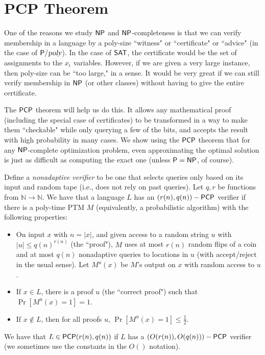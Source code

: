 \section{PCP Theorem}

One of the reasons we study ${\mathsf{NP}}$ and ${\mathsf{NP}}$-completeness is that we can verify membership in a language by a poly-size ``witness" or ``certificate" or ``advice" (in the case of ${\mathsf{P}}/{\textsl{poly}}$). In the case of ${\mathsf{SAT}}$, the certificate would be the set of assignments to the $x_i$ variables. However, if we are given a very large instance, then poly-size can be ``too large," in a sense. It would be very great if we can still verify membership in ${\mathsf{NP}}$ (or other classes) without having to give the entire certificate.

\par The ${\mathsf{PCP}}$ theorem will help us do this. It allows any mathematical proof (including the special case of certificates) to be transformed in a way to make them ``checkable" while only querying a few of the bits, and accepts the result with high probability in many cases. We show using the ${\mathsf{PCP}}$ theorem that for any ${\mathsf{NP}}$-complete optimization problem, even approximating the optimal solution is just as difficult as computing the exact one (unless ${\mathsf{P}} = {\mathsf{NP}}$, of course).

\begin{definition}
Define a \emph{nonadaptive verifier} to be one that selects queries only based on its input and random tape (i.e., does not rely on past queries). Let $q, r$ be functions from $\mathbb{N} \rightarrow \mathbb{N}$. We have that a language $L$ has an $(r(n), q(n))-{\mathsf{PCP}}$ verifier if there is a poly-time PTM $M$ (equivalently, a probabilistic algorithm) with the following properties:
\begin{itemize}
\item On input $x$ with $n = |x|$, and given access to a random string $u$ with $|u| \le q(n)^{r(n)}$ (the ``proof"), $M$ uses at most $r(n)$ random flips of a coin and at most $q(n)$ nonadaptive queries to locations in $u$ (with accept/reject in the usual sense). Let $M^u(x)$ be $M$'s output on $x$ with random access to $u$. 
\item If $x \in L$, there is a proof $u$ (the ``correct proof") such that $\Pr[M^u(x) = 1] = 1$.
\item If $x \notin L$, then for all proofs $u$, $\Pr[M^u(x) = 1] \le \frac{1}{2}$. 
\end{itemize}
We have that $L \in {\ensuremath{\mathsf{PCP}}}(r(n), q(n))$ if $L$ has a $(O(r(n)), O(q(n)))-{\mathsf{PCP}}$ verifier (we sometimes use the constants in the $O()$ notation). 
\end{definition}

